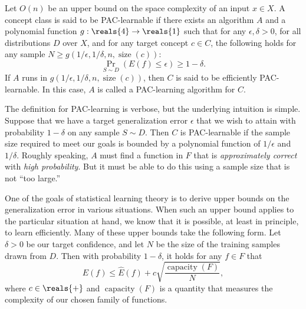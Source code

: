 \documentclass[11pt,a4paper]{article}
\numberwithin{equation}{section}
\newcommand{\size}{\operatorname{size}}
\newcommand{\capacity}{\operatorname{capacity}}
\begin{document}
\begin{definition}
Let $O(n)$ be an upper bound on the space complexity of an input $x \in X$. A
concept class is said to be PAC-learnable if there exists an algorithm $A$ and a
polynomial function $g : \reals{4} \to \reals{1}$ such that for any $\epsilon,
\delta > 0$, for all distributions $D$ over $X$, and for any target concept $c
\in C$, the following holds for any sample $N \geq g(1/\epsilon, 1/\delta, n,
\size(c))$:
\[
	\Pr_{S \sim D} (E(f) \leq \epsilon) \geq 1 - \delta.
\]
If $A$ runs in $g(1/\epsilon, 1/\delta, n, \size(c))$, then $C$ is said to be
efficiently PAC-learnable. In this case, $A$ is called a PAC-learning algorithm
for $C$.
\end{definition}

The definition for PAC-learning is verbose, but the underlying intuition is
simple. Suppose that we have a target generalization error $\epsilon$ that we
wish to attain with probability $1 - \delta$ on any sample $S \sim D$. Then $C$
is PAC-learnable if the sample size required to meet our goals is bounded by a
polynomial function of $1/\epsilon$ and $1/\delta$. Roughly speaking, $A$ must
find a function in $F$ that is \emph{approximately correct} with \emph{high
probability}. But it must be able to do this using a sample size that is not
``too large.''

One of the goals of statistical learning theory is to derive upper bounds on the
generalization error in various situations. When such an upper bound applies to
the particular situation at hand, we know that it is possible, at least in
principle, to learn efficiently. Many of these upper bounds take the following
form. Let $\delta > 0$ be our target confidence, and let $N$ be the size of the
training samples drawn from $D$. Then with probability $1 - \delta$, it holds
for any $f \in F$ that
\begin{equation}
	E(f) \leq \hat{E}(f) + c \sqrt{\frac{\capacity(F)}{N}},
	\label{eq:generalization_bound}
\end{equation}
where $c \in \reals{+}$ and $\capacity(F)$ is a quantity that measures the
complexity of our chosen family of functions.
\end{document}
